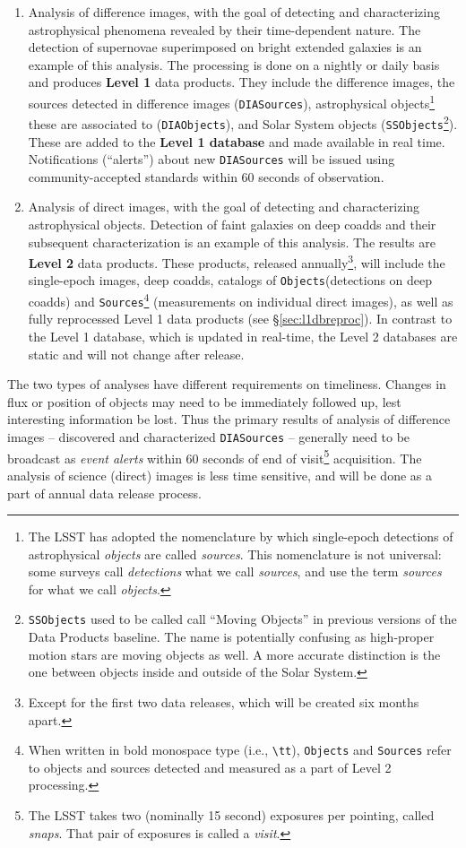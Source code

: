 \documentclass[12pt]{article}
\newcommand{\code}[1]{\texttt{#1}}
\newcommand{\DIASources}{\code{DIASources}\xspace}
\newcommand{\DIAObjects}{\code{DIAObjects}\xspace}
\newcommand{\DB}{{Level 1 database}\xspace}
\newcommand{\DR}{{Level 2 database}\xspace}
\newcommand{\Objects}{\code{Objects}\xspace}
\newcommand{\Sources}{\code{Sources}\xspace}
\newcommand{\SSObjects}{\code{SSObjects}\xspace}
\begin{document}
\begin{enumerate}
\item Analysis of difference images, with the goal of detecting and characterizing astrophysical phenomena revealed by their time-dependent nature. The detection of supernovae superimposed on bright extended galaxies is an example of this analysis. The processing is done on a nightly or daily basis and produces {\bf Level 1} data products. They include the difference images, the sources detected in difference images (\DIASources), astrophysical objects\footnote{The LSST has adopted the nomenclature by which single-epoch detections of astrophysical {\em objects} are called {\em sources}. This nomenclature is not universal: some surveys call {\em detections} what we call {\em sources}, and use the term {\em sources} for what we call {\em objects}.} these are associated to (\DIAObjects), and Solar System objects (\SSObjects\footnote{\SSObjects used to be called call ``Moving Objects'' in previous versions of the Data Products baseline. The name is potentially confusing as high-proper motion stars are moving objects as well. A more accurate distinction is the one between objects inside and outside of the Solar System.}). These are added to the {\bf \DB} and made available in real time. Notifications (``alerts'') about new \DIASources will be issued using community-accepted standards within 60 seconds of observation.
\item Analysis of direct images, with the goal of detecting and characterizing astrophysical objects. Detection of faint galaxies on deep coadds and their subsequent characterization is an example of this analysis. The results are {\bf Level 2} data products. These products, released annually\footnote{Except for the first two data releases, which will be created six months apart.}, will include the single-epoch images, deep coadds, catalogs of \Objects (detections on deep coadds) and \Sources\footnote{When written in bold monospace type (i.e., {\tt \textbackslash{}tt}), \Objects and \Sources refer to objects and sources detected and measured as a part of Level 2 processing.} (measurements on individual direct images), as well as fully reprocessed Level 1 data products (see \S \ref{sec:l1dbreproc}). In contrast to the \DB, which is updated in real-time, the \DR{}s are static and will not change after release.
\end{enumerate}
 
The two types of analyses have different requirements on timeliness. Changes in flux or position of objects may need to be immediately followed up, lest interesting information be lost. Thus the primary results of analysis of difference images -- discovered and characterized \DIASources{} -- generally need to be broadcast as {\em event alerts} within 60 seconds of end of visit\footnote{The LSST takes two (nominally 15 second) exposures per pointing, called {\em snaps}. That pair of exposures is called a {\em visit}.} acquisition. The analysis of science (direct) images is less time sensitive, and will be done as a part of annual data release process.
\end{document}
